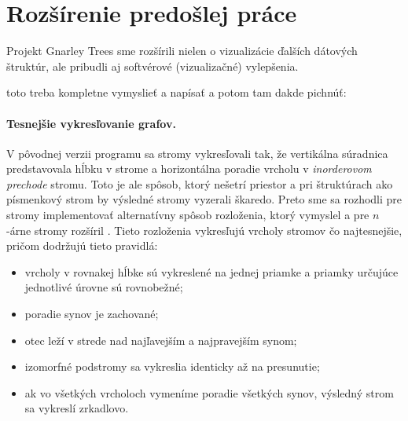 \section{Rozšírenie predošlej práce}

Projekt Gnarley Trees sme rozšírili nielen o vizualizácie ďalších dátových
štruktúr, ale pribudli aj softvérové (vizualizačné) vylepšenia.

toto treba kompletne vymyslieť a napísať a potom tam dakde pichnúť:

\paragraph{Tesnejšie vykresľovanie grafov.}
V pôvodnej verzii programu sa stromy vykresľovali tak, že vertikálna súradnica 
predstavovala hĺbku v strome a horizontálna poradie vrcholu v \emph{
inorderovom prechode} stromu. Toto je ale spôsob, ktorý 
nešetrí priestor a pri štruktúrach ako písmenkový strom by výsledné stromy 
vyzerali škaredo. Preto sme sa rozhodli pre stromy implementovať 
alternatívny spôsob rozloženia, ktorý vymyslel \citet{reingold} a pre $n$-árne 
stromy rozšíril \citet{walker}. Tieto rozloženia vykresľujú vrcholy stromov čo 
najtesnejšie, pričom dodržujú tieto pravidlá: 
\begin{itemize} 
\item vrcholy v rovnakej hĺbke sú vykreslené na jednej priamke a priamky 
určujúce jednotlivé úrovne sú rovnobežné; 
\item poradie synov je zachované; 
\item otec leží v strede nad najľavejším a najpravejším synom; 
\item izomorfné podstromy sa vykreslia identicky až na presunutie;
\item ak vo všetkých vrcholoch vymeníme poradie všetkých synov, výsledný strom 
sa vykreslí zrkadlovo.
\end{itemize}

